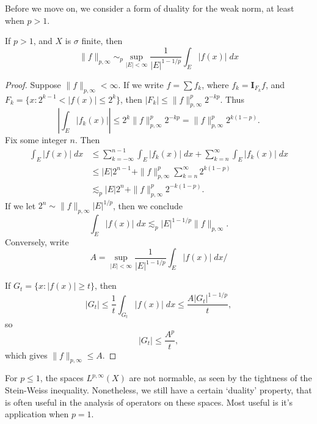 Before we move on, we consider a form of duality for the weak norm, at least when $p > 1$.

\begin{theorem}
	If $p > 1$, and $X$ is $\sigma$ finite, then
	\[ \| f \|_{p,\infty} \sim_p \sup_{|E| < \infty} \frac{1}{|E|^{1-1/p}} \int_E |f(x)|\; dx \]
\end{theorem}
\begin{proof}
	Suppose $\| f \|_{p,\infty} < \infty$. If we write $f = \sum f_k$, where $f_k = \mathbf{I}_{F_k} f$, and $F_k = \{ x: 2^{k-1} < |f(x)| \leq 2^k \}$, then $|F_k| \leq \| f \|_{p,\infty}^p 2^{-kp}$. Thus
	\[ \left| \int_E |f_k(x)| \right| \leq 2^k \| f \|_{p,\infty}^p 2^{-kp} = \| f \|_{p,\infty}^p 2^{k(1-p)}. \]
	Fix some integer $n$. Then
	\begin{align*}
		\int_E |f(x)|\; dx &\leq \sum_{k = -\infty}^{n-1} \int_E |f_k(x)|\; dx + \sum_{k = n}^\infty \int_E |f_k(x)|\; dx\\
		&\leq |E| 2^{n-1} + \| f \|_{p,\infty}^p \sum_{k = n}^\infty 2^{k(1-p)}\\
		&\lesssim_p |E| 2^n + \| f \|_{p,\infty}^p 2^{-k(1-p)}.
	\end{align*}
	If we let $2^n \sim \| f \|_{p,\infty} |E|^{1/p}$, then we conclude
	\[ \int_E |f(x)|\; dx \lesssim_p |E|^{1 - 1/p} \| f \|_{p,\infty}. \]
	Conversely, write
	\[ A = \sup_{|E| < \infty} \frac{1}{|E|^{1-1/p}} \int_E |f(x)|\; dx/ \]

	If $G_t = \{ x: |f(x)| \geq t \}$, then
	\[ |G_t| \leq \frac{1}{t} \int_{G_t} |f(x)|\; dx \leq \frac{A |G_t|^{1 - 1/p}}{t}, \]
	so
	\[ |G_t| \leq \frac{A^p}{t}, \]
	which gives $\| f \|_{p,\infty} \leq A$.
\end{proof}

For $p \leq 1$, the spaces $L^{p,\infty}(X)$ are not normable, as seen by the tightness of the Stein-Weiss inequality. Nonetheless, we still have a certain `duality' property, that is often useful in the analysis of operators on these spaces. Most useful is it's application when $p = 1$.

